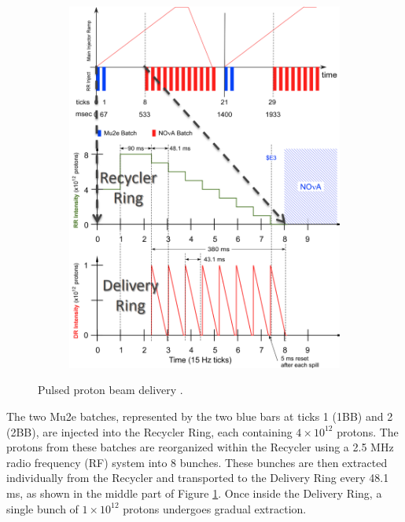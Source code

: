 \begin{figure}[!h]
\begin{subfigure}[b]{0.7\linewidth}
         \includegraphics[scale = 0.39]{figures/png/Screenshot_20240301_151418.png}
         \label{fig:deliver}
     \end{subfigure}
     \caption[The pulsed proton beam delivery.]{Pulsed proton beam delivery \cite{accelerator}.}
        \label{fig:three graphs1}
\end{figure}
The two Mu2e batches, represented by the two blue bars at ticks 1 (1BB) and 2 (2BB), are injected 
into the Recycler Ring, each containing $4 \times 10^{12}$ protons. The 
protons from these batches are reorganized within the Recycler using a 2.5 
MHz radio frequency (RF) system into 8 bunches. These bunches are then extracted 
individually from the Recycler and transported to the Delivery Ring every 48.1 ms, 
as shown in the middle part of Figure \ref{fig:deliver}. Once inside the Delivery 
Ring, a single bunch of $1 \times 10^{12}$ protons undergoes gradual extraction. 

